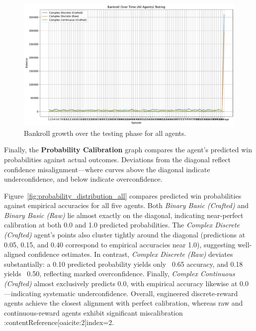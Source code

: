 \documentclass[sigconf]{acmart}
\begin{document}
\begin{figure}[t]
  \centering
  \includegraphics[width=\textwidth]{bankroll_all_testing.pdf}
  \caption{Bankroll growth over the testing phase for all agents.}
  \label{fig:bankroll_all_testing}
\end{figure}

Finally, the \textbf{Probability Calibration} graph compares the agent's predicted win probabilities against actual outcomes. Deviations from the diagonal reflect confidence misalignment—where curves above the diagonal indicate underconfidence, and below indicate overconfidence.

\bigskip

Figure~\ref{fig:probability_distribution_all} compares predicted win probabilities against empirical accuracies for all five agents. Both \emph{Binary Basic (Crafted)} and \emph{Binary Basic (Raw)} lie almost exactly on the diagonal, indicating near‐perfect calibration at both 0.0 and 1.0 predicted probabilities. The \emph{Complex Discrete (Crafted)} agent’s points also cluster tightly around the diagonal (predictions at 0.05, 0.15, and 0.40 correspond to empirical accuracies near 1.0), suggesting well‐aligned confidence estimates. In contrast, \emph{Complex Discrete (Raw)} deviates substantially: a 0.10 predicted probability yields only ~0.65 accuracy, and 0.18 yields ~0.50, reflecting marked overconfidence. Finally, \emph{Complex Continuous (Crafted)} almost exclusively predicts 0.0, with empirical accuracy likewise at 0.0—indicating systematic underconfidence. Overall, engineered discrete‐reward agents achieve the closest alignment with perfect calibration, whereas raw and continuous‐reward agents exhibit significant miscalibration :contentReference[oaicite:2]{index=2}.

\bigskip
\end{document}
